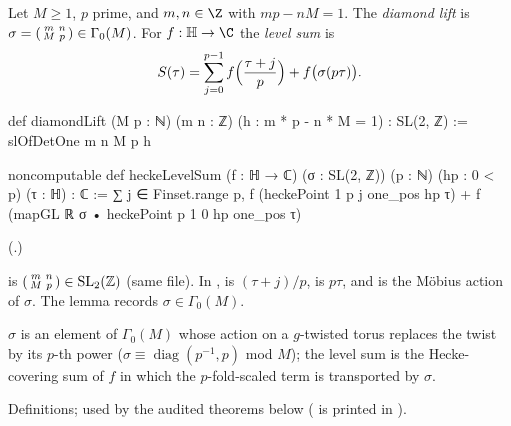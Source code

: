 \begin{definition}\label{ch16:def:diamond}
Let $M\ge1$, $p$ prime, and $m,n\in\Z$ with $mp-nM=1$.  The \emph{diamond lift} is
$\sigma=\left(\begin{smallmatrix}m&n\\M&p\end{smallmatrix}\right)\in\Gamma_0(M)$.  For $f:\chsixteenH\to\C$ the \emph{level sum} is
\begin{equation*}
  S(\tau)=\sum_{j=0}^{p-1}f\Bigl(\frac{\tau+j}{p}\Bigr)+f\bigl(\sigma(p\tau)\bigr).
\end{equation*}
\end{definition}
\begin{leancode}
def diamondLift (M p : ℕ) (m n : ℤ) (h : m * p - n * M = 1) : SL(2, ℤ) :=
  slOfDetOne m n M p h

noncomputable def heckeLevelSum (f : ℍ → ℂ) (σ : SL(2, ℤ)) (p : ℕ) (hp : 0 < p) (τ : ℍ) : ℂ :=
  ∑ j ∈ Finset.range p, f (heckePoint 1 p j one_pos hp τ) +
    f (mapGL ℝ σ • heckePoint p 1 0 hp one_pos τ)
\end{leancode}
(.)
\begin{dictionary}
 is $\left(\begin{smallmatrix}m&n\\M&p\end{smallmatrix}\right)\in\mathrm{SL}_2(\mathbb{Z})$ (same file).  In ,
 is $(\tau+j)/p$,  is $p\tau$, and  is the M\"obius
action of $\sigma$.  The lemma  records $\sigma\in\Gamma_0(M)$.
\end{dictionary}
\begin{physics}
$\sigma$ is an element of $\Gamma_0(M)$ whose action on a $g$-twisted torus replaces the twist by its $p$-th power
($\sigma\equiv\operatorname{diag}(p^{-1},p)$ mod $M$); the level sum is the Hecke-covering sum of $f$ in which the
$p$-fold-scaled term is transported by $\sigma$.
\end{physics}
\begin{status}
Definitions; used by the audited theorems below ( is printed in
).
\end{status}

